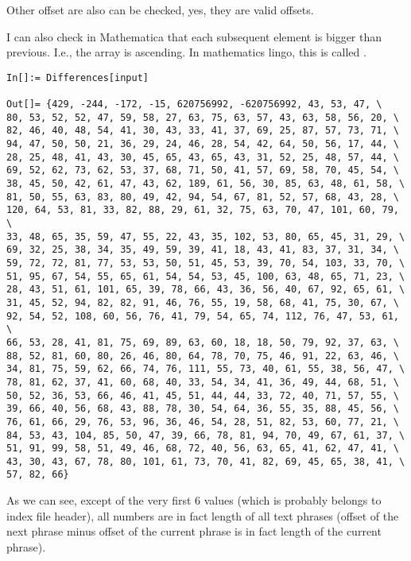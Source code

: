 Other offset are also can be checked, yes, they are valid offsets.

I can also check in Mathematica that each subsequent element is bigger than previous.
I.e., the array is ascending.
In mathematics lingo, this is called .

\begin{lstlisting}
In[]:= Differences[input]

Out[]= {429, -244, -172, -15, 620756992, -620756992, 43, 53, 47, \
80, 53, 52, 52, 47, 59, 58, 27, 63, 75, 63, 57, 43, 63, 58, 56, 20, \
82, 46, 40, 48, 54, 41, 30, 43, 33, 41, 37, 69, 25, 87, 57, 73, 71, \
94, 47, 50, 50, 21, 36, 29, 24, 46, 28, 54, 42, 64, 50, 56, 17, 44, \
28, 25, 48, 41, 43, 30, 45, 65, 43, 65, 43, 31, 52, 25, 48, 57, 44, \
69, 52, 62, 73, 62, 53, 37, 68, 71, 50, 41, 57, 69, 58, 70, 45, 54, \
38, 45, 50, 42, 61, 47, 43, 62, 189, 61, 56, 30, 85, 63, 48, 61, 58, \
81, 50, 55, 63, 83, 80, 49, 42, 94, 54, 67, 81, 52, 57, 68, 43, 28, \
120, 64, 53, 81, 33, 82, 88, 29, 61, 32, 75, 63, 70, 47, 101, 60, 79, \
33, 48, 65, 35, 59, 47, 55, 22, 43, 35, 102, 53, 80, 65, 45, 31, 29, \
69, 32, 25, 38, 34, 35, 49, 59, 39, 41, 18, 43, 41, 83, 37, 31, 34, \
59, 72, 72, 81, 77, 53, 53, 50, 51, 45, 53, 39, 70, 54, 103, 33, 70, \
51, 95, 67, 54, 55, 65, 61, 54, 54, 53, 45, 100, 63, 48, 65, 71, 23, \
28, 43, 51, 61, 101, 65, 39, 78, 66, 43, 36, 56, 40, 67, 92, 65, 61, \
31, 45, 52, 94, 82, 82, 91, 46, 76, 55, 19, 58, 68, 41, 75, 30, 67, \
92, 54, 52, 108, 60, 56, 76, 41, 79, 54, 65, 74, 112, 76, 47, 53, 61, \
66, 53, 28, 41, 81, 75, 69, 89, 63, 60, 18, 18, 50, 79, 92, 37, 63, \
88, 52, 81, 60, 80, 26, 46, 80, 64, 78, 70, 75, 46, 91, 22, 63, 46, \
34, 81, 75, 59, 62, 66, 74, 76, 111, 55, 73, 40, 61, 55, 38, 56, 47, \
78, 81, 62, 37, 41, 60, 68, 40, 33, 54, 34, 41, 36, 49, 44, 68, 51, \
50, 52, 36, 53, 66, 46, 41, 45, 51, 44, 44, 33, 72, 40, 71, 57, 55, \
39, 66, 40, 56, 68, 43, 88, 78, 30, 54, 64, 36, 55, 35, 88, 45, 56, \
76, 61, 66, 29, 76, 53, 96, 36, 46, 54, 28, 51, 82, 53, 60, 77, 21, \
84, 53, 43, 104, 85, 50, 47, 39, 66, 78, 81, 94, 70, 49, 67, 61, 37, \
51, 91, 99, 58, 51, 49, 46, 68, 72, 40, 56, 63, 65, 41, 62, 47, 41, \
43, 30, 43, 67, 78, 80, 101, 61, 73, 70, 41, 82, 69, 45, 65, 38, 41, \
57, 82, 66}
\end{lstlisting}

As we can see, except of the very first 6 values (which is probably belongs to index file header), all numbers are in fact length of all text phrases (offset of the next phrase minus offset of the current phrase is in fact length of the current phrase).

